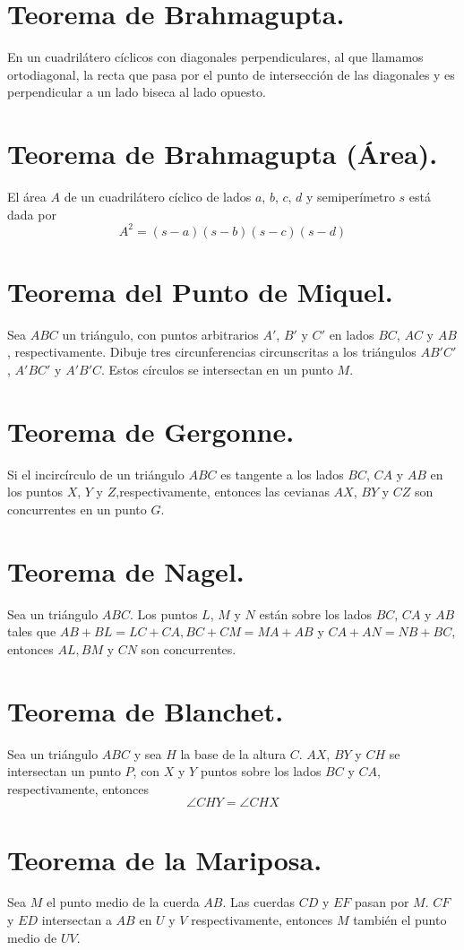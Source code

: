 \documentclass[12pt,a4paper,oneside]{book}
\begin{document}
\section{Teorema de Brahmagupta.}
En un cuadrilátero cíclicos con diagonales perpendiculares, al que llamamos ortodiagonal, la recta que pasa por el punto de intersección de las diagonales y es perpendicular a un lado biseca al lado opuesto.
\section{Teorema de Brahmagupta (Área).}
El área $A$ de un cuadrilátero cíclico de lados $a$, $b$, $c$, $d$ y semiperímetro $s$ está dada por $$A^2=(s-a)(s-b)(s-c)(s-d)$$
\section{Teorema del Punto de Miquel.}
Sea $ABC$ un triángulo, con puntos arbitrarios $A'$, $B'$ y $C'$ en lados $BC$, $AC$ y $AB$ , respectivamente. Dibuje tres circunferencias circunscritas a los triángulos $AB'C'$, $A'BC'$ y $A'B'C$. Estos círculos se intersectan en un punto $M$.
\section{Teorema de Gergonne.}
Si el incircírculo de un triángulo $ABC$ es tangente a los lados $BC$, $CA$ y $AB$ en los puntos $X$, $Y$ y $Z$,respectivamente, entonces las cevianas  $AX$, $BY$ y $CZ$ son concurrentes en un punto $G.$
\section{Teorema de Nagel.}
Sea un triángulo $ABC$. Los puntos $L$, $M$ y $N$ están sobre los lados $BC$, $CA$ y $AB$ tales que $AB + BL = LC + CA, BC + CM= MA + AB$ y $CA + AN= NB + BC$, entonces $AL, BM$ y $CN$ son concurrentes.
\section{Teorema de Blanchet.}
Sea un triángulo $ABC$ y sea $H$ la base de la altura $C$. $AX$, $BY$ y $CH$ se intersectan un punto $P$, con $X$ y $Y$ puntos sobre los lados $BC$ y $CA$, respectivamente, entonces $$\angle CHY = \angle CHX$$
\section{Teorema de la Mariposa.}
Sea $M$ el punto medio de la cuerda $AB$. Las cuerdas $CD$ y $EF$ pasan por $M$. $CF$ y $ED$ intersectan a $AB$ en $U$ y $V$ respectivamente, entonces $M$ también el punto medio de $UV$.
\end{document}
